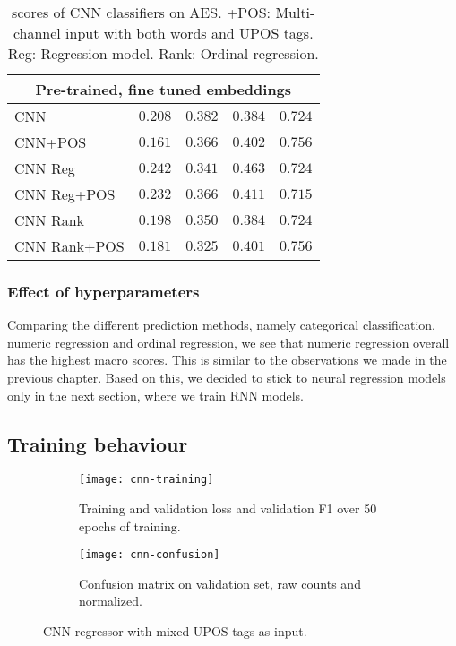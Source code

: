 \begin{table}
\begin{tabular}{lrrrr}
    \midrule
    \multicolumn{5}{c}{Pre-trained, fine tuned embeddings} \\
    \midrule
    CNN & $0.208$ & $0.382$ & $0.384$ & $0.724$ \\
    CNN+POS & $0.161$ & $0.366$ & $0.402$ & $\mathbf{0.756}$ \\
    CNN Reg & $0.242$ & $0.341$ & $\mathbf{0.463}$ & $0.724$ \\
    CNN Reg+POS & $0.232$ & $0.366$ & $0.411$ & $0.715$ \\
    CNN Rank & $0.198$ & $0.350$ & $0.384$ & $0.724$ \\
    CNN Rank+POS & $0.181$ & $0.325$ & $0.401$ & $\mathbf{0.756}$ \\
    \bottomrule
  \end{tabular}
  \caption[\FI scores of CNN classifiers on AES.]{
    \FI scores of CNN classifiers on AES. +POS: Multi-channel input with
    both words and UPOS tags. Reg: Regression model. Rank: Ordinal regression.
  }
  \label{tab:cnn-results}
\end{table}


\subsubsection{Effect of hyperparameters}

Comparing the different prediction methods, namely categorical
classification, numeric regression and ordinal regression, we see that
numeric regression overall has the highest macro \FI scores. This is similar
to the observations we made in the previous chapter. Based on this, we
decided to stick to neural regression models only in the next section, where
we train \ac{RNN} models.


\subsection{Training behaviour}

\begin{figure}
  \begin{subfigure}{\linewidth}
    \centering
    \texttt{[image: cnn-training]}
    \caption{Training and validation loss and validation F1 over 50 epochs of training.}
  \end{subfigure}
  \begin{subfigure}{\linewidth}
    \centering
    \texttt{[image: cnn-confusion]}
    \caption{Confusion matrix on validation set, raw counts and normalized.}
  \end{subfigure}
  \caption[Training behaviour of CNN regression]{
    CNN regressor with mixed UPOS tags as input.
  }
  \label{fig:cnn-training}
\end{figure}

